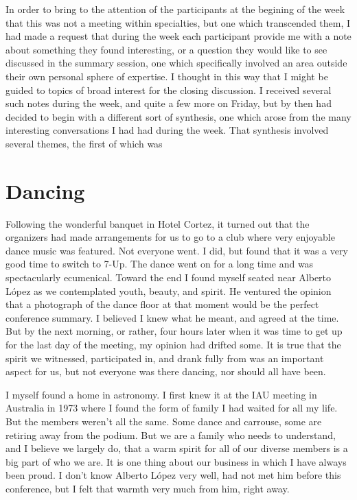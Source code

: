 \documentclass[proceedings]{rmaa}
\begin{document}
In order to bring to the attention of the participants at the begining of 
the week that this was not a meeting within specialties, but one which 
transcended them, I had made a request that during the week each 
participant provide me with a note about something they found 
interesting, or a question they would like to see discussed in the 
summary session, one which specifically involved an area outside their 
own personal sphere of expertise.  I thought in this way that I might be  
guided to topics of broad interest for the closing discussion.  I 
received several such notes during the week, and quite a few more on 
Friday, but by then had decided to begin with a different sort of 
synthesis, one which arose from the many interesting conversations I had  
had during the week.  That synthesis involved several themes, the first 
of which was
\vspace*{-0.5ex}

\section{Dancing}
\vspace*{-0.5ex}

Following the wonderful banquet in Hotel Cortez, it turned out that the 
organizers had made arrangements for us to go to a club where very 
enjoyable dance music was featured.  Not everyone went.  I did, but found 
that it was a very good time to switch to 7-Up.  The dance went on for a  
long time and was spectacularly ecumenical.  Toward the end I found 
myself seated near Alberto L\'opez as we contemplated youth, beauty, and 
spirit.  He ventured the opinion that a photograph of the dance floor at  
that moment would be the perfect conference summary.  I believed I knew 
what he meant, and agreed at the time.  But by the next morning, or 
rather, four hours later when it was time to get up for the last day of 
the meeting, my opinion had drifted some.  It is true that the spirit we  
witnessed, participated in, and drank fully from was an important aspect  
for us, but not everyone was there dancing, nor should all have been.

        I myself found a home in astronomy.  I first knew it at the IAU 
meeting in Australia in 1973 where I found the form of family I had 
waited for all my life.  But the members weren't all the same.   Some 
dance and carrouse, some are retiring away from the podium.  But we are a 
family who needs to understand, and I believe we largely do, that a warm  
spirit for all of our diverse members is a big part of who we are.  It is 
one thing about our business in which I have always been proud.  I don't  
know Alberto L\'opez very well, had not met him before this conference, but 
I felt that warmth very much from him, right away.
\vspace*{-0.5ex}
\end{document}
